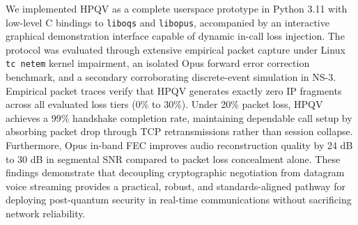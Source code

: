 {We implemented HPQV as a complete userspace prototype in Python 3.11 with low-level C bindings to \texttt{liboqs} and \texttt{libopus}, accompanied by an interactive graphical demonstration interface capable of dynamic in-call loss injection. The protocol was evaluated through extensive empirical packet capture under Linux \texttt{tc netem} kernel impairment, an isolated Opus forward error correction benchmark, and a secondary corroborating discrete-event simulation in NS-3. Empirical packet traces verify that HPQV generates exactly zero IP fragments across all evaluated loss tiers (0\% to 30\%). Under 20\% packet loss, HPQV achieves a 99\% handshake completion rate, maintaining dependable call setup by absorbing packet drop through TCP retransmissions rather than session collapse. Furthermore, Opus in-band FEC improves audio reconstruction quality by 24 dB to 30 dB in segmental SNR compared to packet loss concealment alone. These findings demonstrate that decoupling cryptographic negotiation from datagram voice streaming provides a practical, robust, and standards-aligned pathway for deploying post-quantum security in real-time communications without sacrificing network reliability.
}
